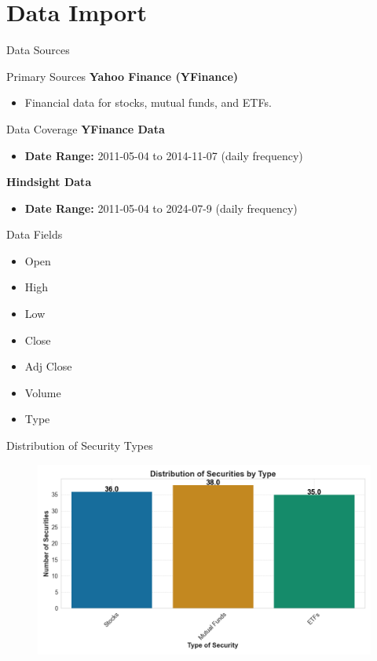 \documentclass{beamer}
\begin{document}
\section{Data Import}
\begin{frame}{Data Sources}
    \begin{block}{Primary Sources}
        \textbf{Yahoo Finance (YFinance)}
        \begin{itemize}
            \item Financial data for stocks, mutual funds, and ETFs.
        \end{itemize}
    \end{block}
    \begin{block}{Data Coverage}
        \textbf{YFinance Data}
        \begin{itemize}
            \item \textbf{Date Range:} 2011-05-04 to 2014-11-07 (daily frequency)
        \end{itemize}
        \textbf{Hindsight Data}
        \begin{itemize}
            \item \textbf{Date Range:} 2011-05-04 to 2024-07-9 (daily frequency)
        \end{itemize}
    \end{block}
    \begin{block}{Data Fields}
        \begin{multicols}{2}
        \begin{itemize}
            \item Open
            \item High
            \item Low
            \item Close
            \item Adj Close
            \item Volume
            \item Type
        \end{itemize}
        \end{multicols}
    \end{block}
\end{frame}

\begin{frame}{Distribution of Security Types}
    \begin{figure}
        \centering
        \includegraphics[width=\linewidth]{histogram_security_count.png}
    \end{figure}
\end{frame}
\end{document}
